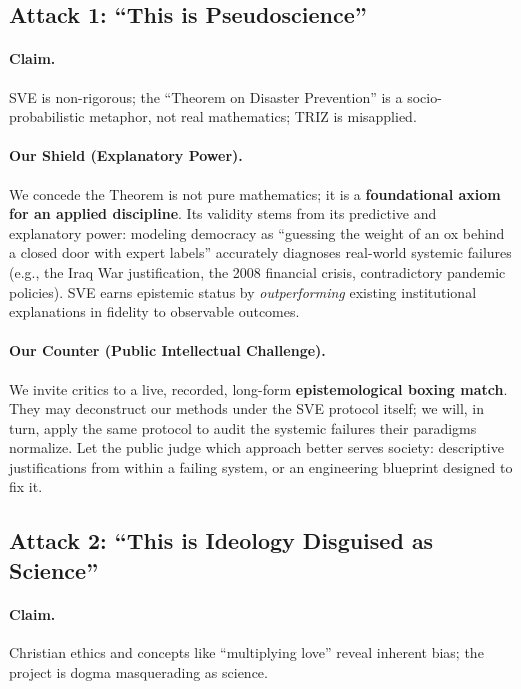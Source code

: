 \documentclass[11pt,a4paper]{article}
\begin{document}
\begin{small}
\subsection*{\textcolor{accentcolor}{Attack 1: ``This is Pseudoscience''}}

\paragraph{\textbf{Claim.}} SVE is non-rigorous; the ``Theorem on Disaster Prevention'' is a socio-probabilistic metaphor, not real mathematics; TRIZ is misapplied.

\paragraph{\textbf{Our Shield (Explanatory Power).}} We concede the Theorem is not pure mathematics; it is a \textbf{foundational axiom for an applied discipline}. Its validity stems from its predictive and explanatory power: modeling democracy as ``guessing the weight of an ox behind a closed door with expert labels'' accurately diagnoses real-world systemic failures (e.g., the Iraq War justification, the 2008 financial crisis, contradictory pandemic policies). SVE earns epistemic status by \textit{outperforming} existing institutional explanations in fidelity to observable outcomes.

\paragraph{\textbf{Our Counter (Public Intellectual Challenge).}} We invite critics to a live, recorded, long-form \textbf{epistemological boxing match}. They may deconstruct our methods under the SVE protocol itself; we will, in turn, apply the same protocol to audit the systemic failures their paradigms normalize. Let the public judge which approach better serves society: descriptive justifications from within a failing system, or an engineering blueprint designed to fix it.

\vspace{1em}

\subsection*{\textcolor{accentcolor}{Attack 2: ``This is Ideology Disguised as Science''}}

\paragraph{\textbf{Claim.}} Christian ethics and concepts like ``multiplying love'' reveal inherent bias; the project is dogma masquerading as science.


\end{small}
\end{document}
